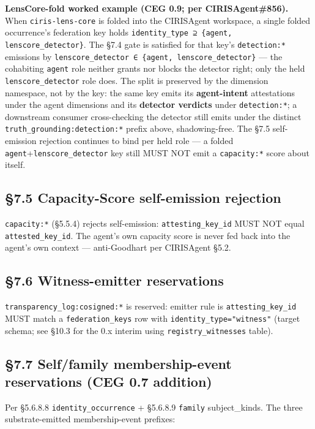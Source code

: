\documentclass[11pt]{article}
\begin{document}
\textbf{LensCore-fold worked example (CEG 0.9; per CIRISAgent\#856).} When \texttt{ciris-lens-core} is folded into the CIRISAgent workspace, a single folded occurrence's federation key holds \texttt{identity\_type ⊇ \{agent, lenscore\_detector\}}. The §7.4 gate is satisfied for that key's \texttt{detection:*} emissions by \texttt{lenscore\_detector ∈ \{agent, lenscore\_detector\}} — the cohabiting \texttt{agent} role neither grants nor blocks the detector right; only the held \texttt{lenscore\_detector} role does. The split is preserved by the dimension namespace, not by the key: the same key emits its \textbf{agent-intent} attestations under the agent dimensions and its \textbf{detector verdicts} under \texttt{detection:*}; a downstream consumer cross-checking the detector still emits under the distinct \texttt{truth\_grounding:detection:*} prefix above, shadowing-free. The §7.5 self-emission rejection continues to bind per held role — a folded \texttt{agent}+\texttt{lenscore\_detector} key still MUST NOT emit a \texttt{capacity:*} score about itself.


\subsection*{§7.5 Capacity-Score self-emission rejection}


\texttt{capacity:*} (§5.5.4) rejects self-emission: \texttt{attesting\_key\_id} MUST NOT equal \texttt{attested\_key\_id}. The agent's own capacity score is never fed back into the agent's own context — anti-Goodhart per CIRISAgent §5.2.


\subsection*{§7.6 Witness-emitter reservations}


\texttt{transparency\_log:cosigned:*} is reserved: emitter rule is \texttt{attesting\_key\_id} MUST match a \texttt{federation\_keys} row with \texttt{identity\_type="witness"} (target schema; see §10.3 for the 0.x interim using \texttt{registry\_witnesses} table).


\subsection*{§7.7 Self/family membership-event reservations (CEG 0.7 addition)}


Per §5.6.8.8 \texttt{identity\_occurrence} + §5.6.8.9 \texttt{family} subject\_kinds. The three substrate-emitted membership-event prefixes:
\end{document}
